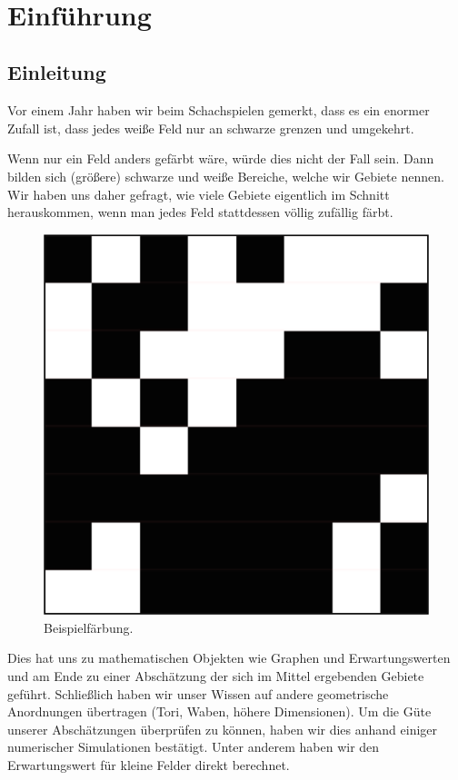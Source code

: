 \documentclass[11pt,a4paper]{article}
\numberwithin{equation}{section}
\numberwithin{table}{section}
\numberwithin{figure}{section}
\begin{document}
\clearpage
\tableofcontents
\listoffigures

~
\thispagestyle{empty}
\clearpage


\section{Einführung}
\setcounter{page}{1}
\subsection{Einleitung}
Vor einem Jahr haben wir beim Schachspielen gemerkt, dass es ein enormer Zufall ist, dass jedes
weiße Feld nur an schwarze grenzen und umgekehrt.\par \noindent
Wenn nur ein Feld anders gefärbt wäre, würde dies nicht der Fall sein. Dann bilden sich (größere) schwarze und weiße Bereiche, welche wir Gebiete nennen.  Wir haben uns daher gefragt, wie viele Gebiete eigentlich im Schnitt herauskommen, wenn man jedes Feld stattdessen völlig zufällig färbt.\begin{figure}[H]\label{bild1}
\begin{center}\includegraphics[scale=0.10]{1.png}
\caption{Beispielfärbung.}\end{center}
\end{figure}
\par\noindent Dies hat uns zu mathematischen Objekten wie Graphen und Erwartungswerten und am Ende zu einer Abschätzung der sich im Mittel ergebenden Gebiete geführt. Schließlich haben wir unser Wissen auf andere geometrische Anordnungen übertragen (Tori, Waben, höhere Dimensionen).
Um die Güte unserer Abschätzungen überprüfen zu können, haben wir dies anhand einiger numerischer Simulationen bestätigt. Unter anderem haben wir den Erwartungswert für kleine Felder direkt berechnet.  
\end{document}
